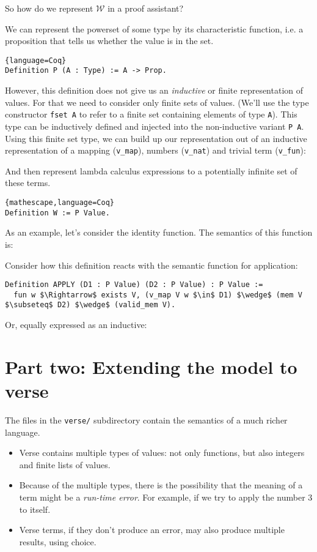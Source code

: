 \documentclass{article}
\theoremstyle{definition}
\newcommand{\codeplus}[3]{%
  }
\begin{document}
So how do we represent $\mathcal{W}$ in a proof assistant?

We can represent the powerset of some type by its characteristic function,
i.e. a proposition that tells us whether the value is in the set.

\begin{lstlisting}{language=Coq}
Definition P (A : Type) := A -> Prop.
\end{lstlisting}

However, this definition does not give us an \emph{inductive} or finite
representation of values. For that we need to consider only finite sets of
values. (We'll use the type constructor \texttt{fset A} to refer to a finite
set containing elements of type \texttt{A}). This type can be inductively
defined and injected into the non-inductive variant \texttt{P A}. Using this
finite set type, we can build up our representation out of an inductive
representation of a mapping (\texttt{v\_map}), numbers (\texttt{v_nat}) and
trivial term (\texttt{v\_fun}):

\codeplus{../coq/simple/model.v}{Value}{language=Coq}

And then represent lambda calculus expressions to a potentially infinite set
of these terms.

\begin{lstlisting}{mathescape,language=Coq}
Definition W := P Value.
\end{lstlisting}

As an example, let's consider the identity function. The 
semantics of this function is:

\codeplus{../coq/simple/model.v}{idset}{} 

Consider how this definition reacts with the semantic function for application:

\begin{lstlisting}[language=Coq,mathescape]
Definition APPLY (D1 : P Value) (D2 : P Value) : P Value :=
  fun w $\Rightarrow$ exists V, (v_map V w $\in$ D1) $\wedge$ (mem V $\subseteq$ D2) $\wedge$ (valid_mem V).
\end{lstlisting}

Or, equally expressed as an inductive:

\codeplus{../coq/simple/model.v}{APPLY}{} 

\section{Part two: Extending the model to verse}

The files in the  \texttt{verse/} subdirectory contain the semantics of a much richer language.

\begin{itemize}
\item Verse contains multiple types of values: not only functions, but also integers and finite lists of values.
\item Because of the multiple types, there is the possibility
that the meaning of a term might be a \emph{run-time error}. For
example, if we try to apply the number 3 to itself.
\item Verse terms, if they don't produce an error, may also 
  produce multiple results, using choice.
\end{itemize}
\end{document}
